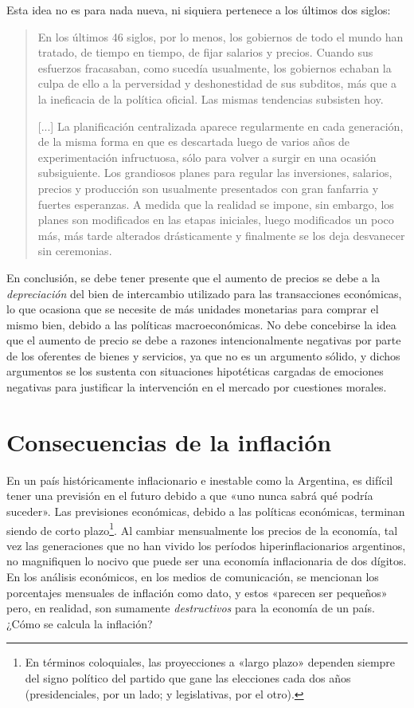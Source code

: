 \documentclass[12pt,a4paper,twoside]{book}
\begin{document}
Esta idea no es para nada nueva, ni siquiera pertenece a los últimos dos siglos:

\begin{quotation}
En los últimos 46 siglos, por lo menos, los gobiernos de todo el mundo han tratado, de tiempo en tiempo, de fijar salarios y precios. Cuando sus esfuerzos fracasaban, como sucedía usualmente, los gobiernos echaban la culpa de ello a la perversidad y deshonestidad de sus subditos, más que a la ineficacia de la política oficial. Las mismas tendencias subsisten hoy.

[...] La planificación centralizada aparece regularmente en cada generación, de la misma forma en que es descartada luego de varios años de experimentación infructuosa, sólo para volver a surgir en una ocasión subsiguiente. Los grandiosos planes para regular las inversiones, salarios, precios y producción son usualmente presentados con gran fanfarria y fuertes esperanzas. A medida que la realidad se impone, sin embargo, los planes son modificados en las etapas iniciales, luego modificados un poco más, más tarde alterados drásticamente y finalmente se los deja desvanecer sin ceremonias. \cite[pág. 23]{4milanos}
\end{quotation}

En conclusión, se debe tener presente que el aumento de precios se debe a la \textit{depreciación} del bien de intercambio utilizado para las transacciones económicas, lo que ocasiona que se necesite de más unidades monetarias para comprar el mismo bien, debido a las políticas macroeconómicas. No debe concebirse la idea que el aumento de precio se debe a razones intencionalmente negativas por parte de los oferentes de bienes y servicios, ya que no es un argumento sólido, y dichos argumentos se los sustenta con situaciones hipotéticas cargadas de emociones negativas para justificar la intervención en el mercado por cuestiones morales.

\section{Consecuencias de la inflación}
En un país históricamente inflacionario e inestable como la Argentina, es difícil tener una previsión en el futuro debido a que «uno nunca sabrá qué podría suceder». Las previsiones económicas, debido a las políticas económicas, terminan siendo de corto plazo\footnote{En términos coloquiales, las proyecciones a «largo plazo» dependen siempre del signo político del partido que gane las elecciones cada dos años (presidenciales, por un lado; y legislativas, por el otro).}. Al cambiar mensualmente los precios de la economía, tal vez las generaciones que no han vivido los períodos hiperinflacionarios argentinos, no magnifiquen lo nocivo que puede ser una economía inflacionaria de dos dígitos. En los análisis económicos, en los medios de comunicación, se mencionan los porcentajes mensuales de inflación como dato, y estos «parecen ser pequeños» pero, en realidad, son sumamente \textit{destructivos} para la economía de un país. ¿Cómo se calcula la inflación?
\end{document}
